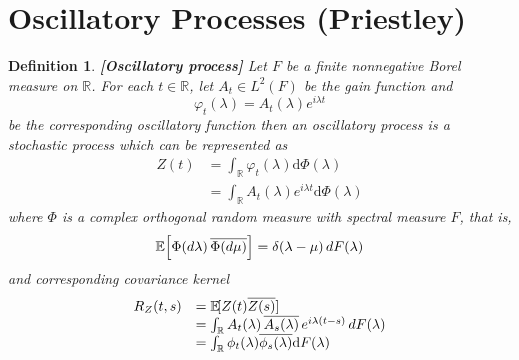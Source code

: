 \documentclass{article}
\newcommand{\mathd}{\mathrm{d}}
\newcommand{\tmem}[1]{{\em #1\/}}
\newcommand{\tmstrong}[1]{\textbf{#1}}
\newtheorem{definition}{Definition}
\begin{document}
\section{Oscillatory Processes (Priestley)}\label{sec:oscillatory}

\begin{definition}
  {\tmstrong{[Oscillatory process]\label{def:osc_proc} }}Let $F$ be a finite
  nonnegative Borel measure on $\mathbb{R}$. For each $t \in \mathbb{R}$, let
  $A_t \in L^2 (F)$ be the gain function and
  \begin{equation}
    \varphi_t (\lambda) = A_t (\lambda) e^{i \lambda t} \label{of}
  \end{equation}
  be the corresponding oscillatory function then an {\tmem{oscillatory
  process}} is a stochastic process which can be represented as
  \begin{equation}
    \begin{array}{ll}
      Z (t) & = \int_{\mathbb{R}} \varphi_t (\lambda) \mathd \Phi (\lambda)\\
      & = \int_{\mathbb{R}} A_t (\lambda) e^{i \lambda t} \mathd \Phi
      (\lambda)
    \end{array}
  \end{equation}
  where $\Phi$ is a complex orthogonal random measure with spectral measure
  $F$, that is,
  \begin{equation}
    \mathbb{E} \hspace{-0.17em} \left[ \Phi (d \lambda) \hspace{0.17em}
    \overline{\Phi (d \mu)} \right] = \delta (\lambda - \mu)  \hspace{0.17em}
    dF (\lambda)
  \end{equation}
  and corresponding covariance kernel
  \begin{equation}
    \begin{array}{ll}
      R_Z (t, s) & =\mathbb{E} \hspace{-0.17em} [Z (t) \overline{Z (s)}]\\
      & = \int_{\mathbb{R}} A_t (\lambda) \hspace{0.17em} \overline{A_s
      (\lambda)} \hspace{0.17em} e^{i \lambda (t - s)}  \hspace{0.17em} dF
      (\lambda)\\
      & = \int_{\mathbb{R}} \phi_t (\lambda) \overline{\phi_s (\lambda)}
      \mathd F (\lambda)
    \end{array} \label{covar}
  \end{equation}
\end{definition}
\end{document}
